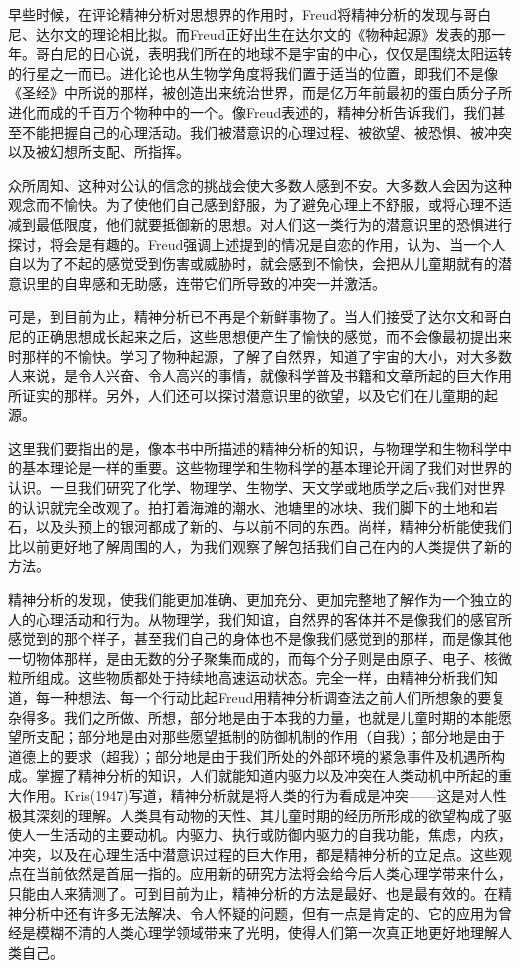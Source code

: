 \documentclass[UTF8,10pt,a4paper,openany]{book}
\begin{document}
早些时候，在评论精神分析对思想界的作用时，Freud将精神分析的发现与哥白尼、达尔文的理论相比拟。而Freud正好出生在达尔文的《物种起源》发表的那一年。哥白尼的日心说，表明我们所在的地球不是宇宙的中心，仅仅是围绕太阳运转的行星之一而已。进化论也从生物学角度将我们置于适当的位置，即我们不是像《圣经》中所说的那样，被创造出来统治世界，而是亿万年前最初的蛋白质分子所进化而成的千百万个物种中的一个。像Freud表述的，精神分析告诉我们，我们甚至不能把握自己的心理活动。我们被潜意识的心理过程、被欲望、被恐惧、被冲突以及被幻想所支配、所指挥。

众所周知、这种对公认的信念的挑战会使大多数人感到不安。大多数人会因为这种观念而不愉快。为了使他们自己感到舒服，为了避免心理上不舒服，或将心理不适减到最低限度，他们就要抵御新的思想。对人们这一类行为的潜意识里的恐惧进行探讨，将会是有趣的。Freud强调上述提到的情况是自恋的作用，认为、当一个人自以为了不起的感觉受到伤害或威胁时，就会感到不愉快，会把从儿童期就有的潜意识里的自卑感和无助感，连带它们所导致的冲突一并激活。

可是，到目前为止，精神分析已不再是个新鲜事物了。当人们接受了达尔文和哥白尼的正确思想成长起来之后，这些思想便产生了愉快的感觉，而不会像最初提出来时那样的不愉快。学习了物种起源，了解了自然界，知道了宇宙的大小，对大多数人来说，是令人兴奋、令人高兴的事情，就像科学普及书籍和文章所起的巨大作用所证实的那样。另外，人们还可以探讨潜意识里的欲望，以及它们在儿童期的起源。

这里我们要指出的是，像本书中所描述的精神分析的知识，与物理学和生物科学中的基本理论是一样的重要。这些物理学和生物科学的基本理论开阔了我们对世界的认识。一旦我们研究了化学、物理学、生物学、天文学或地质学之后v我们对世界的认识就完全改观了。拍打着海滩的潮水、池塘里的冰块、我们脚下的土地和岩石，以及头预上的银河都成了新的、与以前不同的东西。尚样，精神分析能使我们比以前更好地了解周围的人，为我们观察了解包括我们自己在内的人类提供了新的方法。

精神分析的发现，使我们能更加准确、更加充分、更加完整地了解作为一个独立的人的心理活动和行为。从物理学，我们知谊，自然界的客体并不是像我们的感官所感觉到的那个样子，甚至我们自己的身体也不是像我们感觉到的那样，而是像其他一切物体那样，是由无数的分子聚集而成的，而每个分子则是由原子、电子、核微粒所组成。这些物质都处于持续地高速运动状态。完全一样，由精神分析我们知道，每一种想法、每一个行动比起Freud用精神分析调查法之前人们所想象的要复杂得多。我们之所做、所想，部分地是由于本我的力量，也就是儿童时期的本能愿望所支配；部分地是由对那些愿望抵制的防御机制的作用（自我）；部分地是由于道德上的要求（超我）；部分地是由于我们所处的外部环境的紧急事件及机遇所构成。掌握了精神分析的知识，人们就能知道内驱力以及冲突在人类动机中所起的重大作用。Kris(1947)写道，精神分析就是将人类的行为看成是冲突——这是对人性极其深刻的理解。人类具有动物的天性、其儿童时期的经历所形成的欲望构成了驱使人一生活动的主要动机。内驱力、执行或防御内驱力的自我功能，焦虑，内疚，冲突，以及在心理生活中潜意识过程的巨大作用，都是精神分析的立足点。这些观点在当前依然是首屈一指的。应用新的研究方法将会给今后人类心理学带来什么，只能由人来猜测了。可到目前为止，精神分析的方法是最好、也是最有效的。在精神分析中还有许多无法解决、令人怀疑的问题，但有一点是肯定的、它的应用为曾经是模糊不清的人类心理学领域带来了光明，使得人们第一次真正地更好地理解人类自己。
\end{document}
